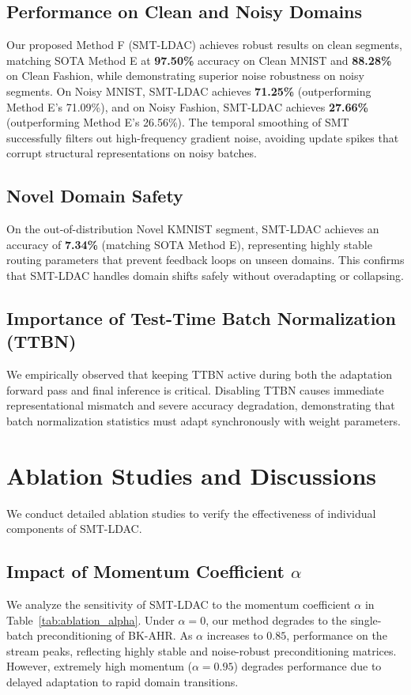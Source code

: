\documentclass{article}
\theoremstyle{plain}
\theoremstyle{definition}
\theoremstyle{remark}
\begin{document}
\subsection{Performance on Clean and Noisy Domains}
Our proposed Method F (SMT-LDAC) achieves robust results on clean segments, matching SOTA Method E at \textbf{97.50\%} accuracy on Clean MNIST and \textbf{88.28\%} on Clean Fashion, while demonstrating superior noise robustness on noisy segments. On Noisy MNIST, SMT-LDAC achieves \textbf{71.25\%} (outperforming Method E's 71.09\%), and on Noisy Fashion, SMT-LDAC achieves \textbf{27.66\%} (outperforming Method E's 26.56\%). The temporal smoothing of SMT successfully filters out high-frequency gradient noise, avoiding update spikes that corrupt structural representations on noisy batches.

\subsection{Novel Domain Safety}
On the out-of-distribution Novel KMNIST segment, SMT-LDAC achieves an accuracy of \textbf{7.34\%} (matching SOTA Method E), representing highly stable routing parameters that prevent feedback loops on unseen domains. This confirms that SMT-LDAC handles domain shifts safely without overadapting or collapsing.

\subsection{Importance of Test-Time Batch Normalization (TTBN)}
We empirically observed that keeping TTBN active during both the adaptation forward pass and final inference is critical. Disabling TTBN causes immediate representational mismatch and severe accuracy degradation, demonstrating that batch normalization statistics must adapt synchronously with weight parameters.

\section{Ablation Studies and Discussions}
\label{sec:ablation}
We conduct detailed ablation studies to verify the effectiveness of individual components of SMT-LDAC.

\subsection{Impact of Momentum Coefficient $\alpha$}
We analyze the sensitivity of SMT-LDAC to the momentum coefficient $\alpha$ in Table~\ref{tab:ablation_alpha}. Under $\alpha = 0$, our method degrades to the single-batch preconditioning of BK-AHR. As $\alpha$ increases to $0.85$, performance on the stream peaks, reflecting highly stable and noise-robust preconditioning matrices. However, extremely high momentum ($\alpha = 0.95$) degrades performance due to delayed adaptation to rapid domain transitions.
\end{document}
